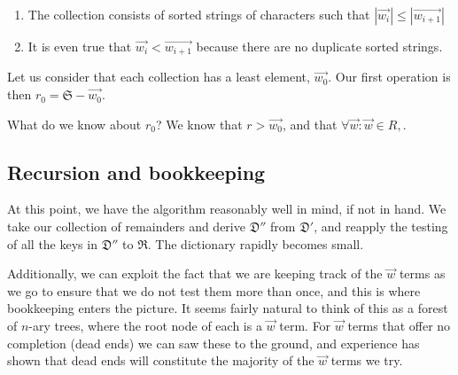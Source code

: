 \documentclass[letterpaper, 11pt]{article}
\newcommand{\Dp}{$\mathfrak{D}'$\xspace}
\newcommand{\Dpp}{$\mathfrak{D}''$\xspace}
\newcommand{\aw}{$\overrightarrow{w}$\xspace}
\begin{document}
\begin{enumerate}
\item The collection consists of sorted strings of characters such that 
$|\overrightarrow{w_i}| \leq |\overrightarrow{w_{i+1}}|$

\item It is even true that 
$\overrightarrow{w_i} < \overrightarrow{w_{i+1}}$ because there are no
duplicate sorted strings.

\end{enumerate}

Let us consider that each collection has a least element,
$\overrightarrow{w_0}$.  Our first operation is then $r_0 = \mathfrak{S}
- \overrightarrow{w_0}$.

What do we know about $r_0$? We know that $r > \overrightarrow{w_0}$,
and that $\forall \overrightarrow{w} : \overrightarrow{w} \in R, $.

\subsection{Recursion and bookkeeping}

At this point, we have the algorithm reasonably well in mind, if not
in hand. We take our collection of remainders and derive \Dpp from \Dp,
and reapply the testing of all the keys in \Dpp to $\mathfrak{R}$.
The dictionary rapidly becomes small. 

Additionally, we can exploit the fact that we are keeping track of
the \aw terms as we go to ensure that we do not test them more than
once, and this is where bookkeeping enters the picture. It seems
fairly natural to think of this as a forest of $n$-ary trees, where
the root node of each is a \aw term. For \aw terms that offer no
completion (\ie dead ends) we can saw these to the ground, and
experience has shown that dead ends will constitute the majority
of the \aw terms we try.
\end{document}
